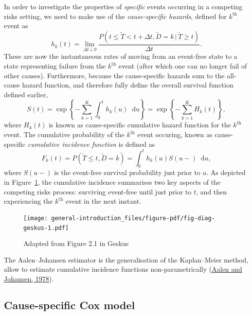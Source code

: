 \documentclass[
  letterpaper,
  DIV=11,
  numbers=noendperiod]{scrreprt}
\newcommand{\given}{\,|\,}
\newcommand\diff{\mathop{}\!\mathrm{d}}
\begin{document}
In order to investigate the properties of \emph{specific} events
occurring in a competing risks setting, we need to make use of the
\emph{cause-specific hazards}, defined for \(k^{\text{th}}\) event as\\
\[
    h_k(t) = \lim_{\Delta t \downarrow 0} \frac{P(t \leq \tilde{T} < t + \Delta t, \tilde{D} = k \given \tilde{T} \geq t)}{\Delta t}.
\] These are now the instantaneous rates of moving from an event-free
state to a state representing failure from the \(k^{\text{th}}\) event
(after which one can no longer fail of other causes). Furthermore,
because the cause-specific hazards sum to the all-cause hazard function,
and therefore fully define the overall survival function defined
earlier, \[
S(t) = \exp \left\{ - \sum_{k = 1}^{K} \int_{0}^{t} h_k(u)\diff u \right\} = \exp \left\{ - \sum_{k = 1}^{K} H_k(t) \right\},
\] where \(H_k(t)\) is known as cause-specific cumulative hazard
function for the \(k^{\text{th}}\) event. The cumulative probability of
the \(k^{\text{th}}\) event occuring, known as cause-specific
\emph{cumulative incidence function} is defined as \[
    F_k(t) = P(\tilde{T} \leq t, \tilde{D} = k) = \int_{0}^{t}h_k(u)S(u-)\diff u,
\] where \(S(u-)\) is the event-free survival probability just prior to
\(u\). As depicted in Figure~\ref{fig-diag-geskus}, the cumulative
incidence summarises two key aspects of the competing risks process:
surviving event-free until just prior to \(t\), and then experiencing
the \(k^{\text{th}}\) event in the next instant.

\begin{figure}

{\centering \texttt{[image: general-introduction\_files/figure-pdf/fig-diag-geskus-1.pdf]}

}

\caption{\label{fig-diag-geskus}Adapted from Figure 2.1 in Geskus}

\end{figure}

The Aalen--Johansen estimator is the generalisation of the Kaplan--Meier
method, allow to estimate cumulative incidence functions
non-parametrically
(\protect\hyperlink{ref-aalenEmpiricalTransitionMatrix1978}{Aalen and
Johansen, 1978}).

\hypertarget{cause-specific-cox-model}{%
\subsection{Cause-specific Cox model}\label{cause-specific-cox-model}}
\end{document}
